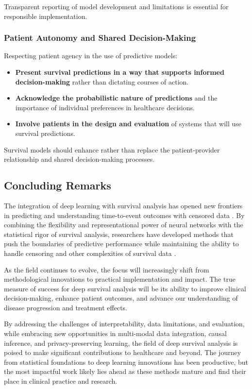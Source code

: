 Transparent reporting of model development and limitations is essential for responsible implementation.

\subsubsection{Patient Autonomy and Shared Decision-Making}

Respecting patient agency in the use of predictive models:

\begin{itemize}
    \item \textbf{Present survival predictions in a way that supports informed decision-making} rather than dictating courses of action.

    \item \textbf{Acknowledge the probabilistic nature of predictions} and the importance of individual preferences in healthcare decisions.

    \item \textbf{Involve patients in the design and evaluation} of systems that will use survival predictions.
\end{itemize}

Survival models should enhance rather than replace the patient-provider relationship and shared decision-making processes.

\subsection{Concluding Remarks}

The integration of deep learning with survival analysis has opened new frontiers in predicting and understanding time-to-event outcomes with censored data \parencite{lee2018,nagpal2021dsm,kvamme2019}. By combining the flexibility and representational power of neural networks with the statistical rigor of survival analysis, researchers have developed methods that push the boundaries of predictive performance while maintaining the ability to handle censoring and other complexities of survival data \parencite{zhong2021,chapfuwa2018,nagpal2021deepsurv}.

As the field continues to evolve, the focus will increasingly shift from methodological innovations to practical implementation and impact. The true measure of success for deep survival analysis will be its ability to improve clinical decision-making, enhance patient outcomes, and advance our understanding of disease progression and treatment effects.

By addressing the challenges of interpretability, data limitations, and evaluation, while embracing new opportunities in multi-modal data integration, causal inference, and privacy-preserving learning, the field of deep survival analysis is poised to make significant contributions to healthcare and beyond. The journey from statistical foundations to deep learning innovations has been productive, but the most impactful work likely lies ahead as these methods mature and find their place in clinical practice and research.
